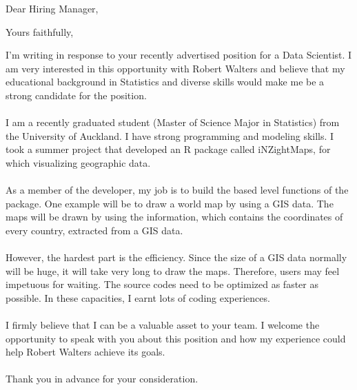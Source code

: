 \documentclass[12pt,a4paper,sans]{moderncv}        %
\title{}                               %
\begin{document}
	\date{19/07/2017}
	\opening{Dear Hiring Manager,}
	\closing{Yours faithfully,}
	\makelettertitle
		
	I’m writing in response to your recently advertised position for a Data Scientist. I am very interested in this opportunity with Robert Walters and believe that my educational background in Statistics and diverse skills would make me be a strong candidate for the position. \\~\\
	I am a recently graduated student (Master of Science Major in Statistics) from the University of Auckland. I have strong programming and modeling skills. I took a summer project that developed an R package called iNZightMaps, for which visualizing geographic data. \\~\\
	As a member of the developer, my job is to build the based level functions of the package. One example will be to draw a world map by using a GIS data. The maps will be drawn by using the information, which contains the coordinates of every country, extracted from a GIS data. \\~\\
	However, the hardest part is the efficiency. Since the size of a GIS data normally will be huge, it will take very long to draw the maps. Therefore, users may feel impetuous for waiting. The source codes need to be optimized as faster as possible. In these capacities, I earnt lots of coding experiences. \\~\\
	I firmly believe that I can be a valuable asset to your team. I welcome the opportunity to speak with you about this position and how my experience could help Robert Walters achieve its goals. \\~\\
	Thank you in advance for your consideration.

	\makeletterclosing
	
\end{document}
